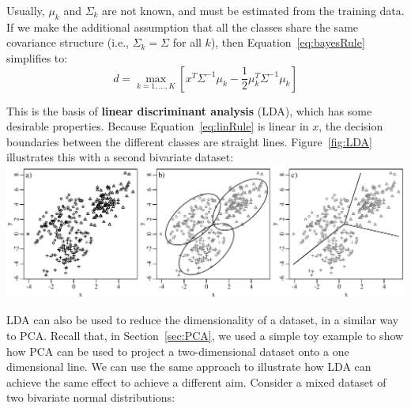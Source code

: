 Usually, $\mu_k$ and $\Sigma_k$ are not known, and must be estimated
from the training data.  If we make the additional assumption that all
the classes share the same covariance structure (i.e., $\Sigma_k =
\Sigma$ for all $k$), then Equation~\ref{eq:bayesRule} simplifies to:
\begin{equation}
  \label{eq:linRule}
d = \underset{k=1,\ldots,K}{\max}\left[
x^T\Sigma^{-1}\mu_k-\frac{1}{2}\mu_k^T\Sigma^{-1}\mu_k \right]
\end{equation}

This is the basis of \textbf{linear discriminant analysis} (LDA),
which has some desirable properties.  Because
Equation~\ref{eq:linRule} is linear in $x$, the decision boundaries
between the different classes are straight lines. Figure~\ref{fig:LDA}
illustrates this with a second bivariate dataset:\\

\noindent\includegraphics[width=\linewidth]{../figures/LDA.pdf}
\begingroup {}
\label{fig:LDA}
\endgroup

LDA can also be used to reduce the dimensionality of a dataset, in a
similar way to PCA. Recall that, in Section~\ref{sec:PCA}, we used a
simple toy example to show how PCA can be used to project a
two-dimensional dataset onto a one dimensional line. We can use the
same approach to illustrate how LDA can achieve the same effect to
achieve a different aim. Consider a mixed dataset of two bivariate
normal distributions:\\

